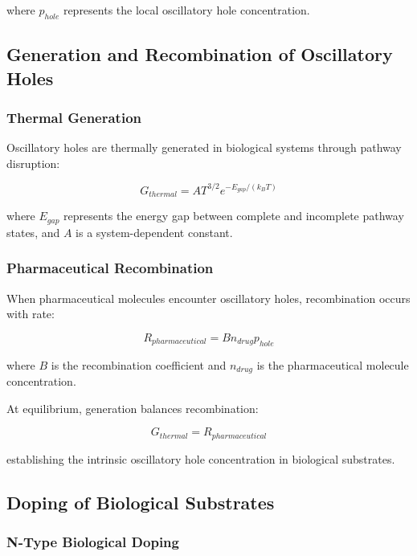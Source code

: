 \documentclass[12pt,a4paper]{article}
\begin{document}
where $p_{hole}$ represents the local oscillatory hole concentration.

\subsection{Generation and Recombination of Oscillatory Holes}

\subsubsection{Thermal Generation}

Oscillatory holes are thermally generated in biological systems through pathway disruption:

\begin{equation}
G_{thermal} = A T^{3/2} e^{-E_{gap}/(k_B T)}
\end{equation}

where $E_{gap}$ represents the energy gap between complete and incomplete pathway states, and $A$ is a system-dependent constant.

\subsubsection{Pharmaceutical Recombination}

When pharmaceutical molecules encounter oscillatory holes, recombination occurs with rate:

\begin{equation}
R_{pharmaceutical} = B n_{drug} p_{hole}
\end{equation}

where $B$ is the recombination coefficient and $n_{drug}$ is the pharmaceutical molecule concentration.

At equilibrium, generation balances recombination:

\begin{equation}
G_{thermal} = R_{pharmaceutical}
\end{equation}

establishing the intrinsic oscillatory hole concentration in biological substrates.

\subsection{Doping of Biological Substrates}

\subsubsection{N-Type Biological Doping}
\end{document}
